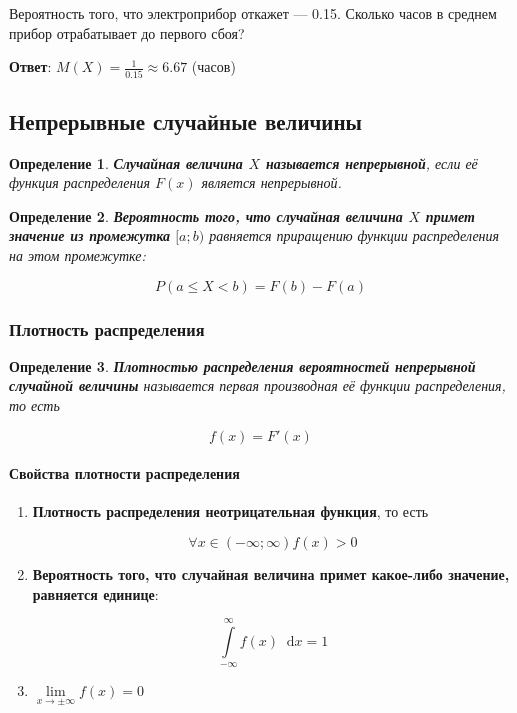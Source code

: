 \documentclass{article}
\newcommand*\diff{\mathop{}\!\mathrm{d}}
\newtheorem{definition}{Определение}
\begin{document}
Вероятность того, что электроприбор откажет — 0.15. Сколько часов в среднем прибор отрабатывает до первого сбоя?

\textbf{Ответ}: $M(X) = \frac{1}{0.15} \approx 6.67$ (часов)

\subsection{Непрерывные случайные величины}

\begin{definition}
    \textbf{Случайная величина $X$ называется непрерывной}, если её функция распределения $F(x)$ является непрерывной.
\end{definition}

\begin{definition}
    \textbf{Вероятность того, что случайная величина $X$ примет значение из промежутка} $[a; b)$ равняется приращению функции распределения на этом промежутке:

    $$
        P(a \le X < b) = F(b) - F(a)
    $$
\end{definition}

\subsubsection{Плотность распределения}

\begin{definition}
    \textbf{Плотностью распределения вероятностей непрерывной случайной величины} называется первая производная её функции распределения, то есть

    $$f(x) = F'(x)$$
\end{definition}

\paragraph{Свойства плотности распределения}

\begin{enumerate}
    \item \textbf{Плотность распределения неотрицательная функция}, то есть
    
    $$\forall x \in (-\infty; \infty) f(x) > 0$$
    \item \textbf{Вероятность того, что случайная величина примет какое-либо значение, равняется единице}: 
    
    $$\int\limits_{-\infty}^{\infty} f(x) \diff x = 1$$
    \item $\lim\limits_{x \to \pm \infty} f(x) = 0$
\end{enumerate}
\end{document}
